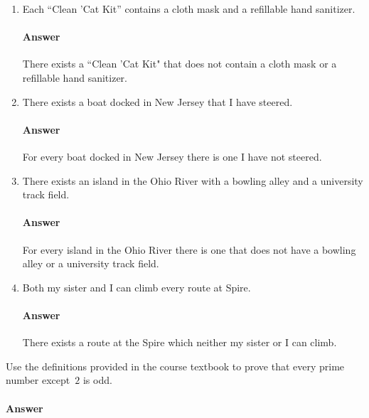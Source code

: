 \documentclass{article}
\begin{document}
\begin{enumerate}

    \item Each ``Clean 'Cat Kit''  contains a cloth mask and a refillable hand
        sanitizer.

        \paragraph{Answer}
        There exists a ``Clean 'Cat Kit" that does not contain a cloth mask or a refillable hand sanitizer.

    \item There exists a boat docked in New Jersey that I have steered.

        \paragraph{Answer}
        For every boat docked in New Jersey there is one I have not steered.

    \item There exists an island in the Ohio River with a bowling alley and a
        university track field.

        \paragraph{Answer}
        For every island in the Ohio River there is one that does not have a bowling alley or a university track field.

    \item Both my sister and I can climb every route at Spire.

        \paragraph{Answer}
        There exists a route at the Spire which neither my sister or I can climb.

\end{enumerate}

 
Use the definitions provided in the course textbook to prove that every prime
number except~$2$ is odd.

\paragraph{Answer}
\end{document}
